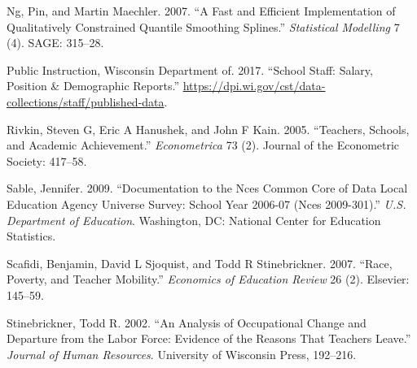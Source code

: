 \documentclass[]{article}
\begin{document}
\hypertarget{ref-ng}{}
Ng, Pin, and Martin Maechler. 2007. ``A Fast and Efficient
Implementation of Qualitatively Constrained Quantile Smoothing
Splines.'' \emph{Statistical Modelling} 7 (4). SAGE: 315--28.

\hypertarget{ref-dpi}{}
Public Instruction, Wisconsin Department of. 2017. ``School Staff:
Salary, Position \& Demographic Reports.''
\url{https://dpi.wi.gov/cst/data-collections/staff/published-data}.

\hypertarget{ref-rivkin}{}
Rivkin, Steven G, Eric A Hanushek, and John F Kain. 2005. ``Teachers,
Schools, and Academic Achievement.'' \emph{Econometrica} 73 (2). Journal
of the Econometric Society: 417--58.

\hypertarget{ref-sable}{}
Sable, Jennifer. 2009. ``Documentation to the Nces Common Core of Data
Local Education Agency Universe Survey: School Year 2006-07 (Nces
2009-301).'' \emph{U.S. Department of Education}. Washington, DC:
National Center for Education Statistics.

\hypertarget{ref-scafidi}{}
Scafidi, Benjamin, David L Sjoquist, and Todd R Stinebrickner. 2007.
``Race, Poverty, and Teacher Mobility.'' \emph{Economics of Education
Review} 26 (2). Elsevier: 145--59.

\hypertarget{ref-stinebrickner}{}
Stinebrickner, Todd R. 2002. ``An Analysis of Occupational Change and
Departure from the Labor Force: Evidence of the Reasons That Teachers
Leave.'' \emph{Journal of Human Resources}. University of Wisconsin
Press, 192--216.
\end{document}
